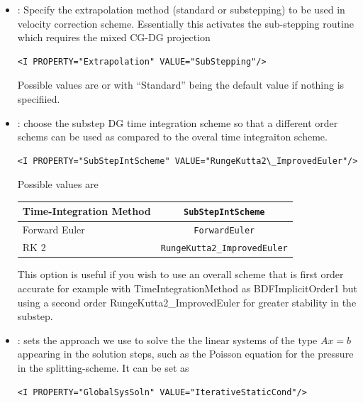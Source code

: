 \begin{itemize}
\item {}: Specify the extrapolation method
  (standard or substepping) to be used in velocity correction
  scheme. Essentially this activates the sub-stepping routine which
  requires the mixed CG-DG projection
  
\begin{lstlisting}[style=XMLStyle]
<I PROPERTY="Extrapolation" VALUE="SubStepping"/>
\end{lstlisting}

Possible values are  or  with ``Standard'' being the default value if nothing is specifiied. 

\item {}: choose the substep DG time integration
  scheme so that a different order schems can be used as compared to
  the overal time integraiton scheme.
\begin{lstlisting}[style=XMLStyle]
<I PROPERTY="SubStepIntScheme" VALUE="RungeKutta2\_ImprovedEuler"/>
\end{lstlisting}

Possible values are
\begin{center}
\footnotesize
\begin{tabular}{lc}
\toprule
{Time-Integration Method} & \texttt{SubStepIntScheme} \\
\midrule
Forward Euler & \texttt{ForwardEuler}  \\
RK 2          & \texttt{RungeKutta2\_ImprovedEuler}  \\
\bottomrule
\end{tabular}
\end{center}

This option is useful if you wish to use an overall scheme that is
first order accurate for example with
TimeIntegrationMethod as BDFImplicitOrder1 but using a second order
RungeKutta2\_ImprovedEuler for greater stability in the substep.

\item {}: sets the approach we use to solve the the linear
systems of the type $Ax=b$ appearing in the solution steps, such as the Poisson
equation for the pressure in the splitting-scheme. It can be set as

\begin{lstlisting}[style=XMLStyle]
<I PROPERTY="GlobalSysSoln" VALUE="IterativeStaticCond"/>
\end{lstlisting}


\end{itemize}
